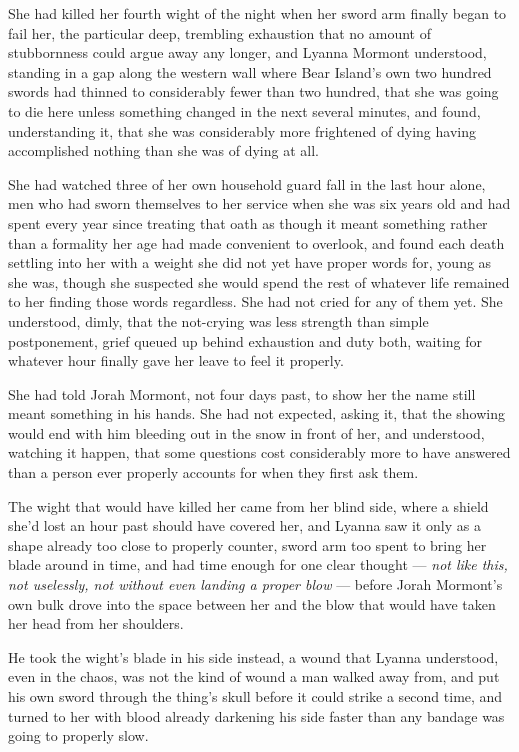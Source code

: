 She had killed her fourth wight of the night when her sword arm finally began to fail her, the particular deep, trembling exhaustion that no amount of stubbornness could argue away any longer, and Lyanna Mormont understood, standing in a gap along the western wall where Bear Island’s own two hundred swords had thinned to considerably fewer than two hundred, that she was going to die here unless something changed in the next several minutes, and found, understanding it, that she was considerably more frightened of dying having accomplished nothing than she was of dying at all.

She had watched three of her own household guard fall in the last hour alone, men who had sworn themselves to her service when she was six years old and had spent every year since treating that oath as though it meant something rather than a formality her age had made convenient to overlook, and found each death settling into her with a weight she did not yet have proper words for, young as she was, though she suspected she would spend the rest of whatever life remained to her finding those words regardless. She had not cried for any of them yet. She understood, dimly, that the not-crying was less strength than simple postponement, grief queued up behind exhaustion and duty both, waiting for whatever hour finally gave her leave to feel it properly.

She had told Jorah Mormont, not four days past, to show her the name still meant something in his hands. She had not expected, asking it, that the showing would end with him bleeding out in the snow in front of her, and understood, watching it happen, that some questions cost considerably more to have answered than a person ever properly accounts for when they first ask them.

\sceneBreak

The wight that would have killed her came from her blind side, where a shield she’d lost an hour past should have covered her, and Lyanna saw it only as a shape already too close to properly counter, sword arm too spent to bring her blade around in time, and had time enough for one clear thought — \textit{not like this, not uselessly, not without even landing a proper blow} — before Jorah Mormont’s own bulk drove into the space between her and the blow that would have taken her head from her shoulders.

He took the wight’s blade in his side instead, a wound that Lyanna understood, even in the chaos, was not the kind of wound a man walked away from, and put his own sword through the thing’s skull before it could strike a second time, and turned to her with blood already darkening his side faster than any bandage was going to properly slow.


